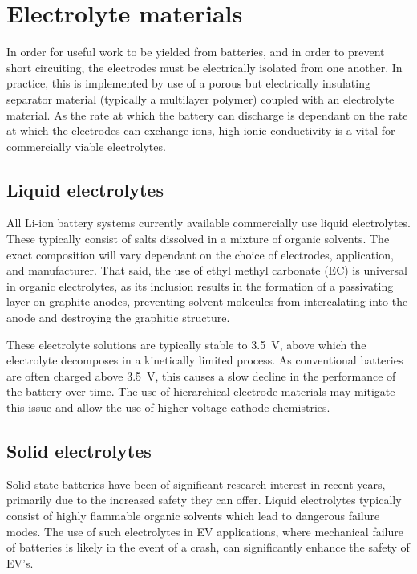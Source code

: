 \newpage
\section{Electrolyte materials}
In order for useful work to be yielded from batteries, and in order to prevent short circuiting, the electrodes must be electrically isolated from one another.
In practice, this is implemented by use of a porous but electrically insulating separator material (typically a multilayer polymer) coupled with an electrolyte material.
As the rate at which the battery can discharge is dependant on the rate at which the electrodes can exchange  ions, high ionic conductivity is a vital for commercially viable electrolytes.


\subsection{Liquid electrolytes}
All Li-ion battery systems currently available commercially use liquid electrolytes.\cite{Famprikis2019}
These typically consist of  salts dissolved in a mixture of organic solvents.
The exact composition will vary dependant on the choice of electrodes, application, and manufacturer.
That said, the use of ethyl methyl carbonate (EC) is universal in organic electrolytes, as its inclusion results in the formation of a passivating layer on graphite anodes, preventing solvent molecules from intercalating into the anode and destroying the graphitic structure.

These electrolyte solutions are typically stable to \SI{3.5}{\volt}, above which the electrolyte decomposes in a kinetically limited process.\cite{Palacin2009a}
As conventional batteries are often charged above \SI{3.5}{\volt}, this causes a slow decline in the performance of the battery over time.
The use of hierarchical electrode materials may mitigate this issue and allow the use of higher voltage cathode chemistries. \cite{Zhou2018}

\subsection{Solid electrolytes}
Solid-state batteries have been of significant research interest in recent years, primarily due to the increased safety they can offer.\cite{Famprikis2019, Zhang2018, Manthiram2017a, Janek2016}
Liquid electrolytes typically consist of highly flammable organic solvents which lead to dangerous failure modes.
The use of such electrolytes in EV applications, where mechanical failure of batteries is likely in the event of a crash, can significantly enhance the safety of EV's.

